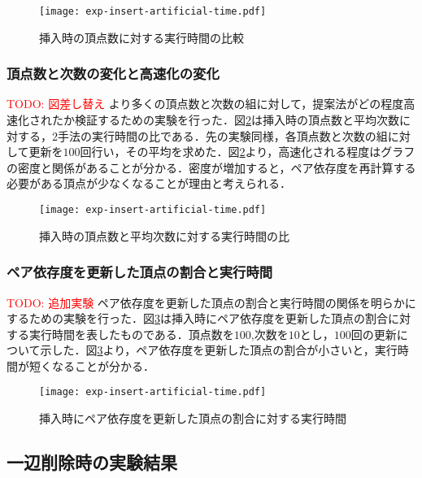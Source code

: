 \begin{figure}[tb]
  \centering
  \texttt{[image: exp-insert-artificial-time.pdf]}
  \caption{挿入時の頂点数に対する実行時間の比較}
  \label{fig:exp-insert-artificial-time}
\end{figure}

\subsubsection{頂点数と次数の変化と高速化の変化}
\textcolor{red}{TODO: 図差し替え}
より多くの頂点数と次数の組に対して，提案法がどの程度高速化されたか検証するための実験を行った．図\ref{fig:exp-insert-artificial-ratio}は挿入時の頂点数と平均次数に対する，2手法の実行時間の比である．先の実験同様，各頂点数と次数の組に対して更新を$100$回行い，その平均を求めた．図\ref{fig:exp-insert-artificial-ratio}より，高速化される程度はグラフの密度と関係があることが分かる．密度が増加すると，ペア依存度を再計算する必要がある頂点が少なくなることが理由と考えられる．

\begin{figure}[tb]
  \centering
  \texttt{[image: exp-insert-artificial-time.pdf]}
  \caption{挿入時の頂点数と平均次数に対する実行時間の比}
  \label{fig:exp-insert-artificial-ratio}
\end{figure}

\subsubsection{ペア依存度を更新した頂点の割合と実行時間}
\textcolor{red}{TODO: 追加実験}
ペア依存度を更新した頂点の割合と実行時間の関係を明らかにするための実験を行った．図\ref{fig:exp-insert-artificial-recalc}は挿入時にペア依存度を更新した頂点の割合に対する実行時間を表したものである．頂点数を$100$,次数を$10$とし，$100$回の更新について示した．図\ref{fig:exp-insert-artificial-recalc}より，ペア依存度を更新した頂点の割合が小さいと，実行時間が短くなることが分かる．

\begin{figure}[tb]
  \centering
  \texttt{[image: exp-insert-artificial-time.pdf]}
  \caption{挿入時にペア依存度を更新した頂点の割合に対する実行時間}
  \label{fig:exp-insert-artificial-recalc}
\end{figure}

\subsection{一辺削除時の実験結果}

